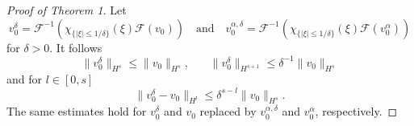 \documentclass{amsart}
\begin{document}
\begin{proof}[Proof of Theorem 1]
Let 
\begin{equation*}v^{\delta}_0 = \mathcal{F}^{-1}\left(\chi_{\{|\xi|\leq 1/\delta\}}(\xi) \mathcal{F}(v_0)\right) \quad\text{and}\quad v^{\alpha,\delta}_0 = \mathcal{F}^{-1}\left(\chi_{\{|\xi|\leq 1/\delta\}}(\xi) \mathcal{F}(v^{\alpha}_0)\right)
\end{equation*}
for $\delta>0$. It follows
\begin{equation}
    \label{eq: x}
    \|v_0^{\delta}\|_{H^s} \leq \|v_0\|_{H^s}, \ \  \ \ \ \ \ \ \|v_0^{\delta}\|_{H^{s+1}} \leq \delta^{-1} \|v_0\|_{H^s}
\end{equation}
and for $l\in[0,s]$
\begin{equation}
    \label{eq: y}
    \|v_0^{\delta}-v_0\|_{H^l} \leq \delta^{s-l} \|v_0\|_{H^{s}}.
\end{equation}
The same estimates hold for $v_0^\delta$ and $v_0$ replaced by $v_0^{\alpha,\delta}$ and $v_0^\alpha$, respectively.


\end{proof}
\end{document}
